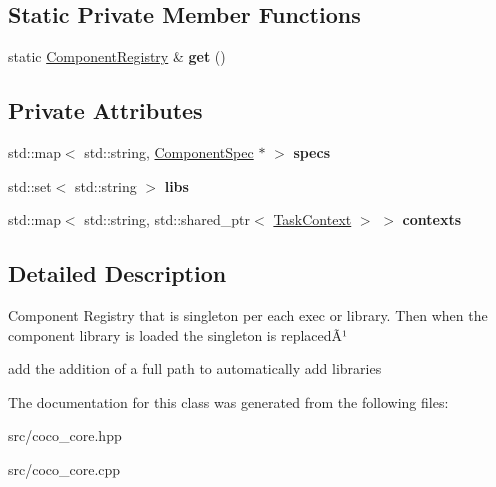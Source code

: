 \subsection*{Static Private Member Functions}
\begin{DoxyCompactItemize}
\item 
\hypertarget{classcoco_1_1_component_registry_a1ada72627a6e3daf61115a20fdfc00f5}{}static \hyperlink{classcoco_1_1_component_registry}{Component\+Registry} \& {\bfseries get} ()\label{classcoco_1_1_component_registry_a1ada72627a6e3daf61115a20fdfc00f5}

\end{DoxyCompactItemize}
\subsection*{Private Attributes}
\begin{DoxyCompactItemize}
\item 
\hypertarget{classcoco_1_1_component_registry_a28ce74205cca34a3d03c7916629c2f58}{}std\+::map$<$ std\+::string, \hyperlink{classcoco_1_1_component_spec}{Component\+Spec} $\ast$ $>$ {\bfseries specs}\label{classcoco_1_1_component_registry_a28ce74205cca34a3d03c7916629c2f58}

\item 
\hypertarget{classcoco_1_1_component_registry_a62eba9c111c9df9405d5c0c7500c91b1}{}std\+::set$<$ std\+::string $>$ {\bfseries libs}\label{classcoco_1_1_component_registry_a62eba9c111c9df9405d5c0c7500c91b1}

\item 
\hypertarget{classcoco_1_1_component_registry_aab792483941bb3b14655cf297fe44034}{}std\+::map$<$ std\+::string, std\+::shared\+\_\+ptr$<$ \hyperlink{classcoco_1_1_task_context}{Task\+Context} $>$ $>$ {\bfseries contexts}\label{classcoco_1_1_component_registry_aab792483941bb3b14655cf297fe44034}

\end{DoxyCompactItemize}


\subsection{Detailed Description}
Component Registry that is singleton per each exec or library. Then when the component library is loaded the singleton is replacedÃ¹

add the addition of a full path to automatically add libraries 

The documentation for this class was generated from the following files\+:\begin{DoxyCompactItemize}
\item 
src/coco\+\_\+core.\+hpp\item 
src/coco\+\_\+core.\+cpp\end{DoxyCompactItemize}
